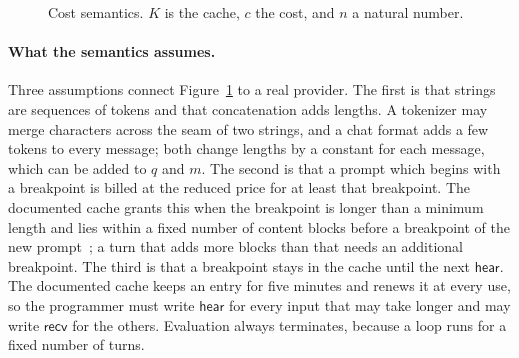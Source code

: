 \documentclass[acmsmall,nonacm,screen]{acmart}
\newcommand{\kw}[1]{\mathsf{#1}}
\newcommand{\cat}{\mathbin{+\!\!+}}
\newcommand{\recv}[1]{\kw{recv}\,#1}
\newcommand{\hear}[1]{\kw{hear}\,#1}
\newcommand{\tail}[2]{\kw{tail}_{#1}\,#2}
\newcommand{\call}[3]{\kw{call}(#1;\,#2,\,#3)}
\newcommand{\letin}[2]{\kw{let}\;#1 = #2\;\kw{in}}
\newcommand{\iter}[4]{\kw{iter}\;#1\;\kw{from}\;#2\;\kw{as}\;#3.\;#4}
\newcommand{\orr}{\mathbin{\kw{or}}}
\newcommand{\ev}[5]{\langle #1,\, #2\rangle \Downarrow^{#3} \langle #4,\, #5\rangle}
\newcommand{\hit}{\mathrm{hit}}
\begin{document}
\begin{figure}[t]
\caption{Cost semantics. $K$ is the cache, $c$ the cost, and $n$ a natural number.}
\label{fig:semantics}
\end{figure}

\paragraph{What the semantics assumes.} Three assumptions connect Figure~\ref{fig:semantics}
to a real provider. The first is that strings are sequences of tokens and that concatenation
adds lengths. A tokenizer may merge characters across the seam of two strings, and a chat
format adds a few tokens to every message; both change lengths by a constant for each
message, which can be added to $q$ and $m$. The second is that a prompt which begins with a
breakpoint is billed at the reduced price for at least that breakpoint. The documented cache
grants this when the breakpoint is longer than a minimum length and lies within a fixed number
of content blocks before a breakpoint of the new prompt~\cite{anthropic2026}; a turn that
adds more blocks than that needs an additional breakpoint. The third is that a breakpoint stays in the
cache until the next $\kw{hear}$. The documented cache keeps an entry for five minutes and
renews it at every use, so the programmer must write $\kw{hear}$ for every input that may take
longer and may write $\kw{recv}$ for the others. Evaluation always terminates, because a
loop runs for a fixed number of turns.
\end{document}
